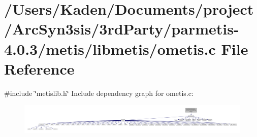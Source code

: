 \hypertarget{a00933}{}\section{/\+Users/\+Kaden/\+Documents/project/\+Arc\+Syn3sis/3rd\+Party/parmetis-\/4.0.3/metis/libmetis/ometis.c File Reference}
\label{a00933}
{\ttfamily \#include \char`\"{}metislib.\+h\char`\"{}}\newline
Include dependency graph for ometis.\+c\+:\nopagebreak
\begin{figure}[H]
\begin{center}
\leavevmode
\includegraphics[width=350pt]{a00934}
\end{center}
\end{figure}
